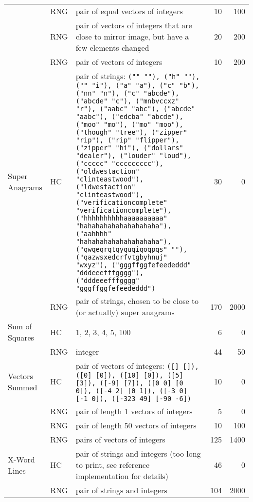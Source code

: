 \documentclass{sig-alternate}
\begin{document}
\begin{table*}
\begin{tabular}{>{\raggedright}p{3.5cm} l >{\raggedright}p{9.8cm} rr}
 & RNG & pair of equal vectors of integers & 10 & 100 \tabularnewline
 & RNG & pair of vectors of integers that are close to mirror image, but have a few elements changed & 20 & 200 \tabularnewline
 & RNG & pair of vectors of integers & 10 & 200 \tabularnewline
Super Anagrams & HC & pair of strings: \texttt{("" ""), ("h" ""), ("" "i"), ("a" "a"), ("c" "b"), ("nn" "n"), ("c" "abcde"), ("abcde" "c"), ("mnbvccxz" "r"), ("aabc" "abc"), ("abcde" "aabc"), ("edcba" "abcde"), ("moo" "mo"), ("mo" "moo"), ("though" "tree"), ("zipper" "rip"), ("rip" "flipper"), ("zipper" "hi"), ("dollars" "dealer"), ("louder" "loud"), ("ccccc" "ccccccccc"), ("oldwestaction" "clinteastwood"), ("ldwestaction" "clinteastwood"), ("verificationcomplete" "verificationcomplete"), ("hhhhhhhhhhaaaaaaaaaa" "hahahahahahahahahaha"), ("aahhhh" "hahahahahahahahahaha"), ("qwqeqrqtqyquqiqoqpqs" ""), ("qazwsxedcrfvtgbyhnuj" "wxyz"), ("gggffggfefeededdd" "dddeeefffgggg"), ("dddeeefffgggg" "gggffggfefeededdd")} & 30 & 0 \tabularnewline
 & RNG & pair of strings, chosen to be close to (or actually) super anagrams & 170 & 2000 \tabularnewline
Sum of Squares & HC & 1, 2, 3, 4, 5, 100 & 6 & 0 \tabularnewline
 & RNG & integer & 44 & 50 \tabularnewline
Vectors Summed & HC & pair of vectors of integers: \texttt{([] []), ([0] [0]), ([10] [0]), ([5] [3]), ([-9] [7]), ([0 0] [0 0]), ([-4 2] [0 1]), ([-3 0] [-1 0]), ([-323 49] [-90 -6])} & 10 & 0 \tabularnewline
 & RNG & pair of length 1 vectors of integers & 5 & 0 \tabularnewline
 & RNG & pair of length 50 vectors of integers & 10 & 100 \tabularnewline
 & RNG & pairs of vectors of integers & 125 & 1400 \tabularnewline
X-Word Lines & HC & pair of strings and integers (too long to print, see reference implementation for details) & 46 & 0 \tabularnewline
 & RNG & pair of strings and integers & 104 & 2000 \tabularnewline
\bottomrule
\end{tabular}
\end{table*}
\end{document}
